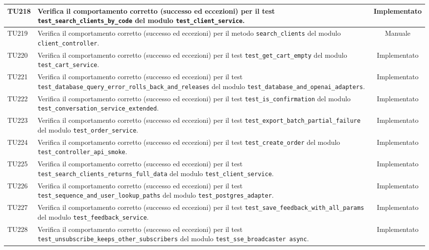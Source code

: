 \documentclass[a4paper,11pt,oneside]{scrartcl}
\begin{document}
\begin{longtable}{|p{1.9cm}|p{11.6cm}|c|}
    TU218 & Verifica il comportamento corretto (successo ed eccezioni) per il test \texttt{test\_search\_clients\_by\_code} del modulo \texttt{test\_client\_service}. & Implementato \\ \hline
    TU219 & Verifica il comportamento corretto (successo ed eccezioni) per il metodo \texttt{search\_clients} del modulo \texttt{client\_controller}. & Manuale \\ \hline
    TU220 & Verifica il comportamento corretto (successo ed eccezioni) per il test \texttt{test\_get\_cart\_empty} del modulo \texttt{test\_cart\_service}. & Implementato \\ \hline
    TU221 & Verifica il comportamento corretto (successo ed eccezioni) per il test \texttt{test\_database\_query\_error\_rolls\_back\_and\_releases} del modulo \texttt{test\_database\_and\_openai\_adapters}. & Implementato \\ \hline
    TU222 & Verifica il comportamento corretto (successo ed eccezioni) per il test \texttt{test\_is\_confirmation} del modulo \texttt{test\_conversation\_service\_extended}. & Implementato \\ \hline
    TU223 & Verifica il comportamento corretto (successo ed eccezioni) per il test \texttt{test\_export\_batch\_partial\_failure} del modulo \texttt{test\_order\_service}. & Implementato \\ \hline
    TU224 & Verifica il comportamento corretto (successo ed eccezioni) per il test \texttt{test\_create\_order} del modulo \texttt{test\_controller\_api\_smoke}. & Implementato \\ \hline
    TU225 & Verifica il comportamento corretto (successo ed eccezioni) per il test \texttt{test\_search\_clients\_returns\_full\_data} del modulo \texttt{test\_client\_service}. & Implementato \\ \hline
    TU226 & Verifica il comportamento corretto (successo ed eccezioni) per il test \texttt{test\_sequence\_and\_user\_lookup\_paths} del modulo \texttt{test\_postgres\_adapter}. & Implementato \\ \hline
    TU227 & Verifica il comportamento corretto (successo ed eccezioni) per il test \texttt{test\_save\_feedback\_with\_all\_params} del modulo \texttt{test\_feedback\_service}. & Implementato \\ \hline
    TU228 & Verifica il comportamento corretto (successo ed eccezioni) per il test \texttt{test\_unsubscribe\_keeps\_other\_subscribers} del modulo \texttt{test\_sse\_broadcaster     async}. & Implementato \\ \hline

\end{longtable}
\end{document}
